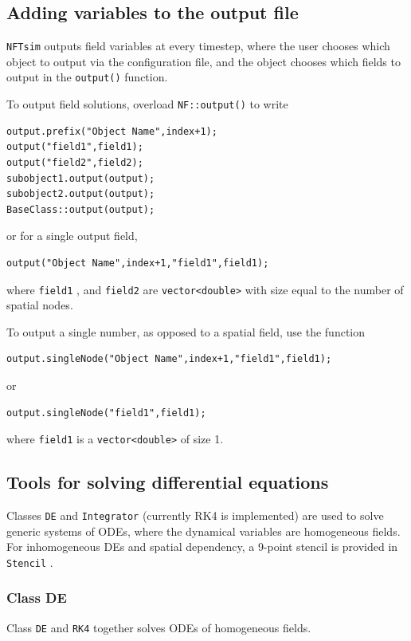 \documentclass[12pt,a4paper]{article}
\newcommand{\type}[1]{{\small\small\tt #1} }
\newcommand{\NF}[0]{\type{NFTsim}}
\begin{document}
\subsection{Adding variables to the output file}
\label{sec:output}

\NF outputs field variables at every timestep, where the user chooses which object to output via the configuration file, and the object chooses which fields to output in the \type{output()} function.

To output field solutions, overload \type{NF::output()} to write
\begin{lstlisting}
output.prefix("Object Name",index+1);
output("field1",field1);
output("field2",field2);
subobject1.output(output);
subobject2.output(output);
BaseClass::output(output);
\end{lstlisting}
or for a single output field,
\begin{lstlisting}
output("Object Name",index+1,"field1",field1);
\end{lstlisting}

where \type{field1}, and \type{field2} are \type{vector<double>} with size equal to the number of spatial nodes.

To output a single number, as opposed to a spatial field, use the function
\begin{lstlisting}
output.singleNode("Object Name",index+1,"field1",field1);
\end{lstlisting}
or
\begin{lstlisting}
output.singleNode("field1",field1);
\end{lstlisting}
where \type{field1} is a \type{vector<double>} of size 1.

\subsection{Tools for solving differential equations}
\label{sec:diffeqn}

Classes \type{DE} and \type{Integrator} (currently RK4 is implemented) are used to solve generic systems of ODEs, where the dynamical variables are homogeneous fields. For inhomogeneous DEs and spatial dependency, a 9-point stencil is provided in \type{Stencil}.

\subsubsection{Class DE}
\label{sec:de}

Class \type{DE} and \type{RK4} together solves ODEs of homogeneous fields.
\end{document}
